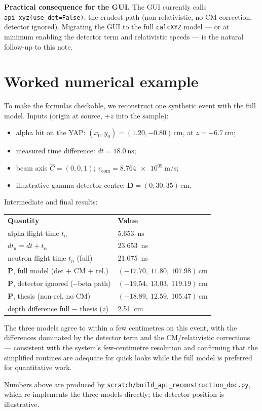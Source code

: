 \documentclass[11pt]{article}
\newcommand{\code}[1]{\texttt{\small #1}}
\newcommand{\dta}{\mathit{dt}_a}
\newcommand{\dt}{\mathit{dt}}
\begin{document}
\noindent\textbf{Practical consequence for the GUI.} The GUI currently calls
\code{api\_xyz(use\_det=False)}, the crudest path (non-relativistic, no CM
correction, detector ignored). Migrating the GUI to the full \code{calcXYZ} model
--- or at minimum enabling the detector term and relativistic speeds --- is the
natural follow-up to this note.

\clearpage
\section{Worked numerical example}
To make the formulas checkable, we reconstruct one synthetic event with the full
model. Inputs (origin at source, $+z$ into the sample):
\begin{itemize}[leftmargin=1.4em,itemsep=2pt]
  \item alpha hit on the YAP: $(x_0,y_0)=(1.20,-0.80)\,\si{\cm}$, at
        $z=-\SI{6.7}{\cm}$;
  \item measured time difference: $\dt=\SI{18.0}{\ns}$;
  \item beam axis $\hat C=(0,0,1)$; $v_{\mathrm{com}}=\SI{8.764e+05}{\meter\per\second}$;
  \item illustrative gamma-detector centre:
        $\bm D=(0,30,35)\,\si{\cm}$.
\end{itemize}
Intermediate and final results:

\begin{center}
\begin{tabular}{p{8.2cm} p{5.0cm}}
\toprule
\rowcolor{steel}\color{white}\textbf{Quantity} & \color{white}\textbf{Value}\\
alpha flight time $t_\alpha$ & \SI{5.653}{\ns}\\
\rowcolor{rowg}$\dta=\dt+t_\alpha$ & \SI{23.653}{\ns}\\
neutron flight time $t_n$ (full) & \SI{21.075}{\ns}\\
\rowcolor{rowg}$\bm P$, full model (det $+$ CM $+$ rel.) & $(-17.70,\ 11.80,\ 107.98)\,\si{\cm}$\\
$\bm P$, detector ignored (-{}-beta path) & $(-19.54,\ 13.03,\ 119.19)\,\si{\cm}$\\
\rowcolor{rowg}$\bm P$, thesis (non-rel, no CM) & $(-18.89,\ 12.59,\ 105.47)\,\si{\cm}$\\
depth difference full $-$ thesis ($z$) & \SI{+2.51}{\cm}\\
\bottomrule
\end{tabular}
\end{center}

The three models agree to within a few centimetres on this event, with the
differences dominated by the detector term and the CM/relativistic corrections
--- consistent with the system's few-centimetre resolution and confirming that
the simplified routines are adequate for quick looks while the full model is
preferred for quantitative work.

\vspace{0.5em}
{\footnotesize\color{black!55} Numbers above are produced by
\code{scratch/build\_api\_reconstruction\_doc.py}, which re-implements the three
models directly; the detector position is illustrative.}
\end{document}
